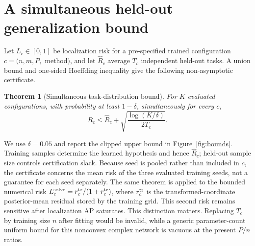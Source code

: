 \documentclass[10pt]{article}
\newtheorem{theorem}{Theorem}
\begin{document}
\section{A simultaneous held-out generalization bound}
Let $L_c\in[0,1]$ be localization risk for a pre-specified trained
configuration $c=(n,m,P,$ method$)$, and let $\widehat R_c$ average $T_c$
independent held-out tasks.  A union bound and one-sided Hoeffding inequality
give the following non-asymptotic certificate.
\begin{theorem}[Simultaneous task-distribution bound]
For $K$ evaluated configurations, with probability at least $1-\delta$,
simultaneously for every $c$,
\[
 R_c\leq \widehat R_c+
 \sqrt{\frac{\log(K/\delta)}{2T_c}}.
\]
\end{theorem}
We use $\delta=0.05$ and report the clipped upper bound in
Figure~\ref{fig:bounds}.  Training samples determine the learned hypothesis
and hence $\widehat R_c$; held-out sample size controls certification slack.
Because seed is pooled rather than included in $c$, the certificate concerns
the mean risk of the three evaluated training seeds, not a guarantee for each
seed separately.
The same theorem is applied to the bounded numerical risk
$L_c^{\rm solve}=r_c^{\rm tr}/(1+r_c^{\rm tr})$, where
$r_c^{\rm tr}$ is the transformed-coordinate posterior-mean residual
stored by the training grid.  This second risk remains sensitive after
localization AP saturates.
This distinction matters.  Replacing $T_c$ by training size $n$ after fitting
would be invalid, while a generic parameter-count uniform bound for this
nonconvex complex network is vacuous at the present $P/n$ ratios.
\end{document}
